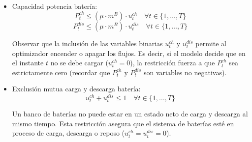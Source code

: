 \begin{itemize}
    Notar que en la carga, solo una fracción $\eta$ de la potencia retirada del sistema de paneles PV llega efectivamente a almacenarse como energía química ($\eta \cdot P_t^{ch}$). En la descarga, para entregar una potencia $P_t^{dis}$ al satélite, la batería debe extraer internamente una cantidad mayor de energía ($P_t^{dis}/\eta$) para compensar las pérdidas por calor y resistencia interna.

    \item Capacidad potencia batería:
    \begin{equation}
        P_t^{ch} \leq (\mu \cdot m^B) \cdot u_t^{ch}
    \quad \forall t \in \{1,\ldots,T\}
    \label{ex:2:2:eq:carga}
    \end{equation}
    \begin{equation}
        P_t^{dis} \leq (\mu \cdot m^B) \cdot u_t^{dis}
    \quad \forall t \in \{1,\ldots,T\}
    \label{ex:2:2:eq:descarga}
    \end{equation}

    Observar que la inclusión de las variables binarias $u_t^{ch}$ y $u_t^{dis}$ permite al optimizador encender o apagar los flujos. Es decir, si el modelo decide que en el instante $t$ no se debe cargar ($u_t^{ch}=0$), la restricción fuerza a que $P_t^{ch}$ sea estrictamente cero (recordar que $P_t^{ch}$ y $P_t^{dis}$ son variables no negativas).

    \item Exclusión mutua carga y descarga batería:
    \begin{equation}
        u_t^{ch} + u_t^{dis} \leq 1
    \quad \forall t \in \{1,\ldots,T\}
    \label{ex:2:2:eq:exclusion}
    \end{equation}

    Un banco de baterías no puede estar en un estado neto de carga y descarga al mismo tiempo. Esta restricción asegura que el sistema de baterías esté en proceso de carga, descarga o reposo ($u_t^{ch} = u_t^{dis}= 0$).
\end{itemize}

